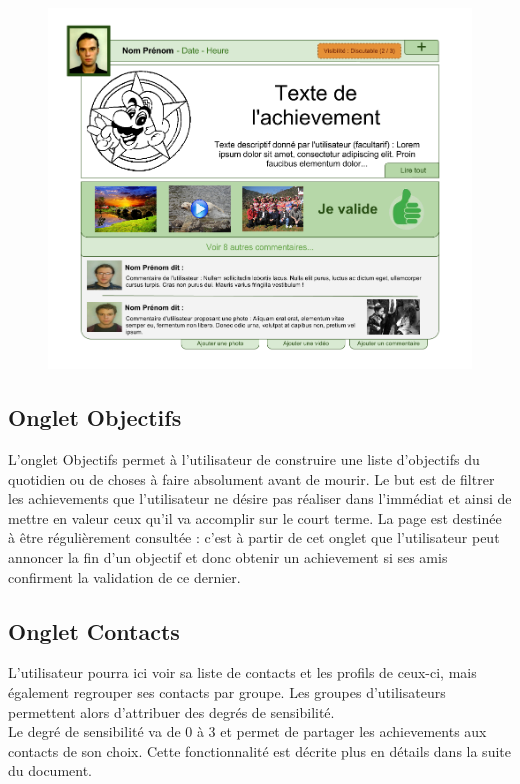 \documentclass{life-fr}
\begin{document}
\begin{figure}[H]
	\begin{center}
		\includegraphics[width=15cm]{img/achievement.png}
	\end{center}
\end{figure}

\subsection{Onglet Objectifs}

L'onglet Objectifs permet à l'utilisateur de construire une liste d'objectifs du quotidien ou de choses à faire absolument avant de mourir. Le but est de filtrer les achievements que l'utilisateur ne désire pas réaliser dans l'immédiat et ainsi de mettre en valeur ceux qu'il va accomplir sur le court terme. La page est destinée à être régulièrement consultée : c'est à partir de cet onglet que l'utilisateur peut annoncer la fin d'un objectif et donc obtenir un achievement si ses amis confirment la validation de ce dernier.

\subsection{Onglet Contacts}

L'utilisateur pourra ici voir sa liste de contacts et les profils de ceux-ci, mais également regrouper ses contacts par groupe. Les groupes d'utilisateurs permettent alors d'attribuer des degrés de sensibilité.\\
Le degré de sensibilité va de 0 à 3 et permet de partager les achievements aux contacts de son choix. Cette fonctionnalité est décrite plus en détails dans la suite du document.
\end{document}

